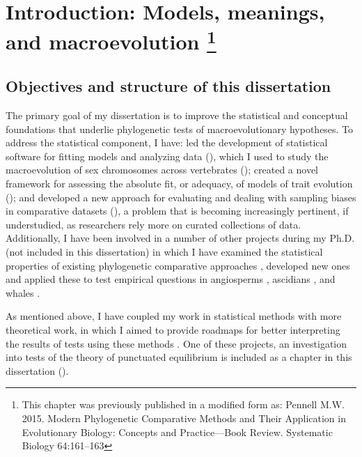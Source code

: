 \chapter[Introduction: Models, meanings, and macroevolution]{Introduction: Models, meanings, and macroevolution \footnote {This chapter was previously published in a modified form as: Pennell M.W. 2015. Modern Phylogenetic Comparative Methods and Their Application in Evolutionary Biology: Concepts and Practice---Book Review. Systematic Biology 64:161--163}}
\label{chap:introduction}

\section{Objectives and structure of this dissertation}

The primary goal of my dissertation is to improve the statistical and conceptual foundations that underlie phylogenetic tests of macroevolutionary hypotheses. To address the statistical component, I have: led the development of statistical software for fitting models and analyzing data (), which I used to study the macroevolution of sex chromosomes across vertebrates (); created a novel framework for assessing the  absolute fit, or adequacy, of models of trait evolution (); and developed a new approach for evaluating and dealing with sampling biases in comparative datasets (), a problem that is becoming increasingly pertinent, if understudied, as researchers rely more on curated collections of data. Additionally, I have been involved in a number of other projects during my Ph.D. (not included in this dissertation) in which I have examined the statistical properties of existing phylogenetic comparative approaches \citep{Pennell2012, UyedaPCA}, developed new ones \citep{SlaterPennell, ksi} and applied these to test empirical questions in angiosperms \citep{ksi, nestedradiations}, ascidians \citep{Maliska2013}, and whales \citep{SlaterPennell}.

As mentioned above, I have coupled my work in statistical methods with more theoretical work, in which I aimed to provide roadmaps for better interpreting the results of tests using these methods \citep{Rosenblum2012, PennellHarmon, PennellPE, PennellTREEresponse, Pennellpcmbook}. One of these projects, an investigation into tests of the theory of punctuated equilibrium \citep{Eldredge1971, EldredgeGould1972} is included as a chapter in this dissertation (). 

